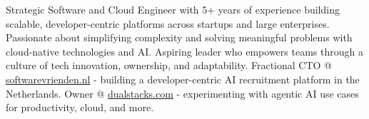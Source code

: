 
\begin{cvparagraph}
Strategic Software and Cloud Engineer with 5+ years of experience building scalable, developer-centric platforms across startups and large enterprises. Passionate about simplifying complexity and solving meaningful problems with cloud-native technologies and AI. Aspiring leader who empowers teams through a culture of tech innovation, ownership, and adaptability. Fractional CTO @ \href{https://softwarevrienden.nl}{softwarevrienden.nl} - building a developer-centric AI recruitment platform in the Netherlands. Owner @ \href{https://dualstacks.com}{dualstacks.com} - experimenting with agentic AI use cases for productivity, cloud, and more.
\end{cvparagraph}
